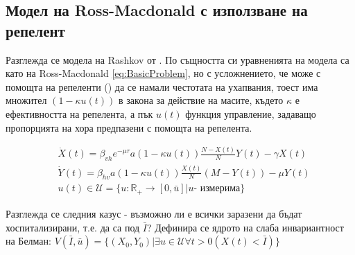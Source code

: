 \subsection{Модел на Ross-Macdonald с използване на репелент}
Разглежда се модела на Rashkov от \cite{Rashkov2019}. По същността си уравненията на модела са като на Ross-Macdonald \eqref{eq:BasicProblem}, но с усложнението, че може с помощта на репеленти (\cite{Grancaric2019}) да се намали честотата на ухапвания, тоест има множител $(1 - \kappa u(t))$ в закона за действие на масите, където $\kappa$ е ефективността на репелента, а пък $u(t)$ функция управление, задаващо пропорцията на хора предпазени с помощта на репелента.

\begin{equation}
  \label{eq:RepelentProblem}
  \begin{split}
    &\dot{X}(t) = \beta_{vh} e^{-\mu \tau} a (1-\kappa u(t)) \frac{N-X(t)}{N} Y(t) - \gamma X(t) \\
    &\dot{Y}(t) = \beta_{hv} a (1-\kappa u(t)) \frac{X(t)}{N} (M-Y(t)) - \mu Y(t) \\
    &u(t) \in \mathscr{U} = \{u:\mathbb{R}_+ \rightarrow [0, \bar{u}] \vert u \text{- измерима}\}
  \end{split}
\end{equation}

Разглежда се следния казус - възможно ли е всички заразени да бъдат хоспитализирани, т.е. да са под $\bar{I}$?
Дефинира се ядрото на слаба инвариантност на Белман:
$V(\bar{I}, \bar{u}) = \{(X_0, Y_0) \vert \exists{u \in \mathscr{U}}\forall t>0 (X(t) < \bar{I})\}$
